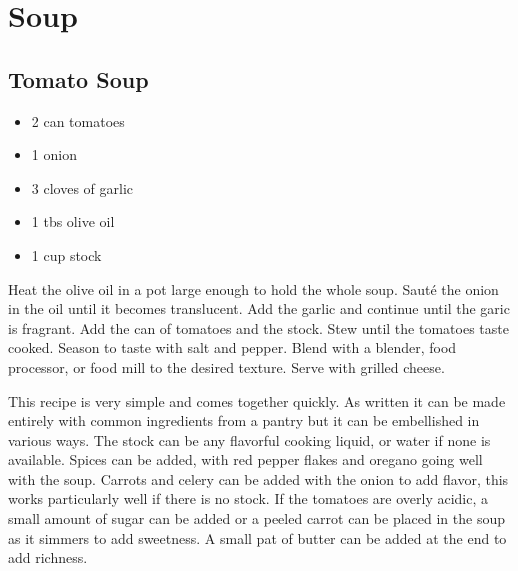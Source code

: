 \chapter{Soup}

\section{Tomato Soup}

\begin{itemize}
 \item 2 can tomatoes
 \item 1 onion
 \item 3 cloves of garlic
 \item 1 tbs olive oil
 \item 1 cup stock
\end{itemize}

Heat the olive oil in a pot large enough to hold the whole soup.
Sauté the onion in the oil until it becomes translucent.
Add the garlic and continue until the garic is fragrant.
Add the can of tomatoes and the stock.
Stew until the tomatoes taste cooked.
Season to taste with salt and pepper.
Blend with a blender, food processor, or food mill to the desired texture.
Serve with grilled cheese.

This recipe is very simple and comes together quickly.
As written it can be made entirely with common ingredients from a pantry
but it can be embellished in various ways.
The stock can be any flavorful cooking liquid, or water if none is available.
Spices can be added, with red pepper flakes and oregano going well with the soup.
Carrots and celery can be added with the onion to add flavor,
this works particularly well if there is no stock.
If the tomatoes are overly acidic, 
a small amount of sugar can be added
or a peeled carrot can be placed in the soup as it simmers to add sweetness.
A small pat of butter can be added at the end to add richness.


